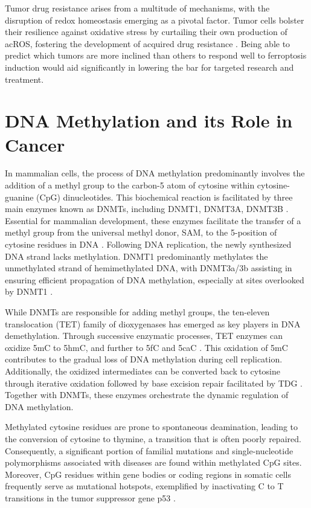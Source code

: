 Tumor drug resistance arises from a multitude of mechanisms, with the disruption of redox homeostasis emerging as a pivotal factor. Tumor cells bolster their resilience against oxidative stress by curtailing their own production of ac{ROS}, fostering the development of acquired drug resistance \citep{ferro_res}. Being able to predict which tumors are more inclined than others to respond well to ferroptosis induction would aid significantly in lowering the bar for targeted research and treatment.

\section{DNA Methylation and its Role in Cancer}

In mammalian cells, the process of DNA methylation predominantly involves the addition of a methyl group to the carbon-5 atom of cytosine within cytosine-guanine (CpG) dinucleotides. This biochemical reaction is facilitated by three main enzymes known as \acp{DNMT}, including DNMT1, DNMT3A, DNMT3B \citep{dnmt_enzymes}. Essential for mammalian development, these enzymes facilitate the transfer of a methyl group from the universal methyl donor, \ac{SAM}, to the 5-position of cytosine residues in DNA \citep{dnmt}. Following DNA replication, the newly synthesized DNA strand lacks methylation. DNMT1 predominantly methylates the unmethylated strand of hemimethylated DNA, with DNMT3a/3b assisting in ensuring efficient propagation of DNA methylation, especially at sites overlooked by DNMT1 \citep{dnmt_enzymes}.

While \acp{DNMT} are responsible for adding methyl groups, the ten-eleven translocation (\ac{TET}) family of dioxygenases has emerged as key players in DNA demethylation. Through successive enzymatic processes, \ac{TET} enzymes can oxidize \ac{5mC} to \ac{5hmC}, and further to \ac{5fC} and \ac{5caC} \citep{tet}. This oxidation of \ac{5mC} contributes to the gradual loss of DNA methylation during cell replication. Additionally, the oxidized intermediates can be converted back to cytosine through iterative oxidation followed by base excision repair facilitated by \ac{TDG} \citep{demeth}. Together with \acp{DNMT}, these enzymes orchestrate the dynamic regulation of DNA methylation.

Methylated cytosine residues are prone to spontaneous deamination, leading to the conversion of cytosine to thymine, a transition that is often poorly repaired. Consequently, a significant portion of familial mutations and single-nucleotide polymorphisms associated with diseases are found within methylated CpG sites. Moreover, CpG residues within gene bodies or coding regions in somatic cells frequently serve as mutational hotspots, exemplified by inactivating C to T transitions in the tumor suppressor gene p53 \citep{meth_p53}.

